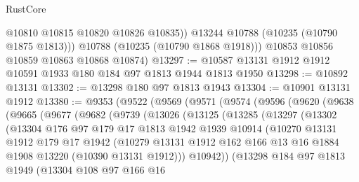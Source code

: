 \begin{lexlean}{RustCore}
\begin{coremodule}
              @10810
              @10815
              @10820
              @10826
              @10835))
          @13244
          @10788
          (@10235 (@10790 @1875 @1813)))
        @10788
        (@10235 (@10790 @1868 @1918)))
      @10853
      @10856
      @10859
      @10863
      @10868
      @10874)
@13297 := @10587 @13131 @1912 @1912 @10591 @1933 @180 @184 @97 @1813 @1944 @1813 @1950
@13298 := @10892 @13131
@13302 := @13298 @180 @97 @1813 @1943
@13304 := @10901 @13131 @1912
@13380 := @9353
    (@9522
      (@9569
        (@9571
          (@9574
            (@9596
              (@9620
                (@9638
                  (@9665
                    (@9677
                      (@9682
                        (@9739
                          (@13026
                            (@13125
                              (@13285
                                (@13297
                                  (@13302
                                    (@13304
                                      @176
                                      @97
                                      @179
                                      @17
                                      @1813
                                      @1942
                                      @1939
                                      @10914
                                      (@10270
                                        @13131
                                        @1912
                                        @179
                                        @17
                                        @1942
                                        (@10279
                                          @13131
                                          @1912
                                          @162
                                          @166
                                          @13
                                          @16
                                          @1884
                                          @1908
                                          @13220
                                          (@10390 @13131 @1912)))
                                      @10942))
                                  (@13298
                                    @184
                                    @97
                                    @1813
                                    @1949
                                    (@13304
                                      @108
                                      @97
                                      @166
                                      @16

\end{coremodule}
\end{lexlean}
